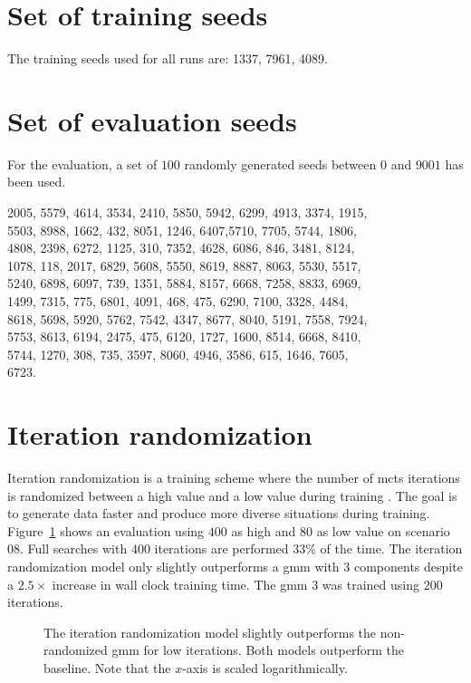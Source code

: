\section{Set of training seeds}\label{app:training_seeds}
The training seeds used for all runs are: 1337, 7961, 4089.

\section{Set of evaluation seeds}\label{app:evaluation_seeds}
For the evaluation, a set of $100$ randomly generated seeds between $0$ and $9001$ has been used.

2005, 5579, 4614, 3534, 2410, 5850, 5942, 6299, 4913, 3374, 1915, \\
5503, 8988, 1662, 432, 8051, 1246, 6407,5710, 7705, 5744, 1806, \\
4808, 2398, 6272, 1125, 310, 7352, 4628, 6086, 846, 3481, 8124,\\
1078, 118, 2017, 6829, 5608, 5550, 8619, 8887, 8063, 5530, 5517,\\
5240, 6898, 6097, 739, 1351, 5884, 8157, 6668, 7258, 8833, 6969,\\
1499, 7315, 775, 6801, 4091, 468, 475, 6290, 7100, 3328, 4484,\\
8618, 5698, 5920, 5762, 7542, 4347, 8677, 8040, 5191, 7558, 7924,\\
5753, 8613, 6194, 2475, 475, 6120, 1727, 1600, 8514, 6668, 8410,\\
5744, 1270, 308, 735, 3597, 8060, 4946, 3586, 615, 1646, 7605,\\
6723. 

\section{Iteration randomization}\label{app:iteration_randomization}
Iteration randomization is a training scheme where the number of \gls{mcts} iterations is randomized between a high value and a low value during training \cite{wuAcceleratingSelfPlayLearning2020}. The goal is to generate data faster and produce more diverse situations during training. Figure~\ref{fig:playout_line} shows an evaluation using $400$ as high and $80$ as low value on scenario 08. Full searches with $400$ iterations are performed $33\%$ of the time. The iteration randomization model  only slightly outperforms a \gls{gmm} with $3$ components despite a $2.5 \times$ increase in wall clock training time. The \gls{gmm} $3$ was trained using $200$ iterations.
\begin{figure}[h]
	\centering
	\captionsetup{justification=centering}
	\scalebox{0.9}{
    
    }
	\caption[Iteration randomization success rate]{The iteration randomization model slightly outperforms the non-randomized \gls{gmm} for low iterations. Both models outperform the baseline. Note that the $x$-axis is scaled logarithmically.}
\label{fig:playout_line}
\end{figure}